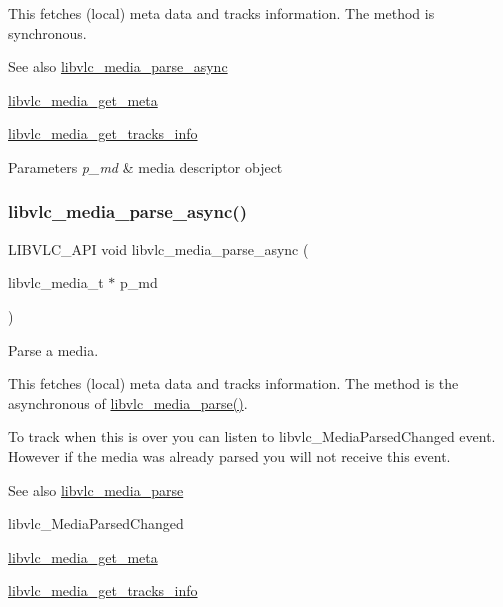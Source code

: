 This fetches (local) meta data and tracks information. The method is synchronous.

\begin{DoxySeeAlso}{See also}
\hyperlink{group__libvlc__media_gada166e6385518f9d5826c2dce647a475}{libvlc\+\_\+media\+\_\+parse\+\_\+async} 

\hyperlink{group__libvlc__media_ga47684ea1970f0c5cddb96a717a75ed6f}{libvlc\+\_\+media\+\_\+get\+\_\+meta} 

\hyperlink{group__libvlc__media_ga2102c151df0ab66d6158a80b7734f0f9}{libvlc\+\_\+media\+\_\+get\+\_\+tracks\+\_\+info}
\end{DoxySeeAlso}

\begin{DoxyParams}{Parameters}
{\em p\+\_\+md} & media descriptor object \\
\hline
\end{DoxyParams}
\mbox{\label{group__libvlc__media_gada166e6385518f9d5826c2dce647a475}} 
\subsubsection{\texorpdfstring{libvlc\+\_\+media\+\_\+parse\+\_\+async()}{libvlc\_media\_parse\_async()}}
{\footnotesize\ttfamily L\+I\+B\+V\+L\+C\+\_\+\+A\+PI void libvlc\+\_\+media\+\_\+parse\+\_\+async (\begin{DoxyParamCaption}\item[{libvlc\+\_\+media\+\_\+t $\ast$}]{p\+\_\+md }\end{DoxyParamCaption})}

Parse a media.

This fetches (local) meta data and tracks information. The method is the asynchronous of \hyperlink{group__libvlc__media_gad9e48150dcb1a066c51688f6e4a216f1}{libvlc\+\_\+media\+\_\+parse()}.

To track when this is over you can listen to libvlc\+\_\+\+Media\+Parsed\+Changed event. However if the media was already parsed you will not receive this event.

\begin{DoxySeeAlso}{See also}
\hyperlink{group__libvlc__media_gad9e48150dcb1a066c51688f6e4a216f1}{libvlc\+\_\+media\+\_\+parse} 

libvlc\+\_\+\+Media\+Parsed\+Changed 

\hyperlink{group__libvlc__media_ga47684ea1970f0c5cddb96a717a75ed6f}{libvlc\+\_\+media\+\_\+get\+\_\+meta} 

\hyperlink{group__libvlc__media_ga2102c151df0ab66d6158a80b7734f0f9}{libvlc\+\_\+media\+\_\+get\+\_\+tracks\+\_\+info}
\end{DoxySeeAlso}

